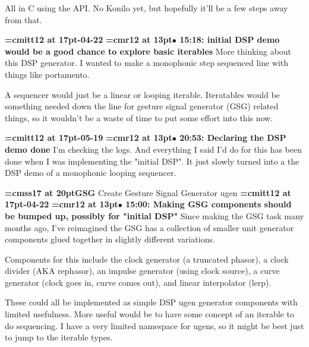 All in C using the API. No Konilo yet, but hopefully it'll be a few steps away from that.
\par

{\medskip\noindent\bf\font\titlefont=cmitt12 at 17pt-04-22}\medskip
{\smallskip\noindent\bf\font\titlefont=cmr12 at 13pt\titlefont $\bullet$ 15:18: initial DSP demo would be a good chance to explore basic iterables}\smallskip
More thinking about this DSP generator. I wanted to make a monophonic step sequenced line with things like portamento.
\par

A sequencer would just be a linear or looping iterable. Iteratables would be something needed down the line for gesture signal generator (GSG) related things, so it wouldn't be a waste of time to put some effort into this now.
\par

{\medskip\noindent\bf\font\titlefont=cmitt12 at 17pt-05-19}\medskip
{\smallskip\noindent\bf\font\titlefont=cmr12 at 13pt\titlefont $\bullet$ 20:53: Declaring the DSP demo done}\smallskip
I'm checking the logs. And everything I said I'd do for this has been done when I was implementing the "initial DSP". It just slowly turned into a the DSP demo of a monophonic looping sequencer.
\par

{\medskip\noindent\bf\font\titlefont=cmss17 at 20pt\titlefont GSG}\medskip
Create Gesture Signal Generator ugen
{\medskip\noindent\bf\font\titlefont=cmitt12 at 17pt-04-22}\medskip
{\smallskip\noindent\bf\font\titlefont=cmr12 at 13pt\titlefont $\bullet$ 15:00: Making GSG components should be bumped up, possibly for "initial DSP"}\smallskip
Since making the GSG task many months ago, I've reimagined the GSG has a collection of smaller unit generator components glued together in slightly different variations.
\par

Components for this include the clock generator (a truncated phasor), a clock divider (AKA rephasor), an impulse generator (using clock source), a curve generator (clock goes in, curve comes out), and linear interpolator (lerp).
\par

These could all be implemented as simple DSP ugen generator components with limited usefulness. More useful would be to have some concept of an iterable to do sequencing. I have a very limited namespace for ugens, so it might be best just to jump to the iterable types.
\par

